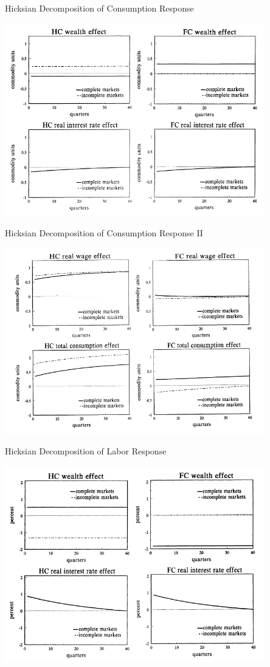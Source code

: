 \documentclass[10pt]{beamer}
\begin{document}
\begin{frame}{Hicksian Decomposition of Consumption Response}
\centerline{\includegraphics[width=0.85\textwidth]{f4.png}}
\end{frame}

\begin{frame}{Hicksian Decomposition of Consumption Response II}
\centerline{\includegraphics[width=0.85\textwidth]{f5.png}}
\end{frame}

\begin{frame}{Hicksian Decomposition of Labor Response}
\centerline{\includegraphics[width=0.85\textwidth]{f6.png}}
\end{frame}
\end{document}
